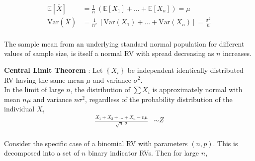 \begin{align}
	\mathbb{E}[\overline{X}] &= \frac{1}{n}\ \left(\mathbb{E}[X_1] + \dots + \mathbb{E}[X_n]\right) = \mu \\
	\mathrm{Var}(\overline{X}) &= \frac{1}{n^2}\ \left[\mathrm{Var}(X_1) + \dots + \mathrm{Var}(X_n)\right] = \frac{\sigma^2}{n}
\end{align}\\

The sample mean from an underlying standard normal population for different values of sample size, is itself a normal RV with spread decreasing as $ n $ increases.\\

\begin{figure}[H]
	\centering
\end{figure}

\textbf{Central Limit Theorem} : Let $ \left\{X_i\right\} $ be independent identically distributed RV having the same mean $ \mu $ and variance $ \sigma^2 $. \\

In the limit of large $ n $, the distribution of $ \sum X_i $ is approximately normal with mean $ n\mu $ and variance $ n\sigma^2 $, regardless of the probability distribution of the individual $ X_i $ \\

\begin{align}
	\frac{X_1 + X_2 + \dots + X_n - n\mu}{\sqrt{n}\ \sigma} &\sim Z
\end{align}\\

Consider the specific case of a binomial RV with parameters $ (n, p) $. This is decomposed into a set of $ n $ binary indicator RVs. Then for large $ n $,\\

